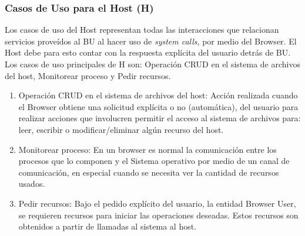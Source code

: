 \subsubsection{Casos de Uso para el Host (H)}
Los casos de uso del Host representan todas las interacciones que relacionan servicios proveídos al BU al hacer uso de \textit{system calls}, por medio del Browser. El Host debe para esto contar con la respuesta explícita del usuario detrás de BU. Los casos de uso principales de H son: Operación CRUD en el sistema de archivos del host, Monitorear proceso y Pedir recursos.
			\begin{enumerate}
				\item Operación CRUD en el sistema de archivos del host: Acción realizada cuando el Browser obtiene una solicitud explícita o no (automática), del usuario para realizar acciones que involucren permitir el acceso al sistema de archivos para: leer, escribir o modificar/eliminar algún recurso del host.

				\item Monitorear proceso: En un browser es normal la comunicación entre los procesos que lo componen y el Sistema operativo por medio de un canal de comunicación, en especial cuando se necesita ver la cantidad de recursos usados.

				\item Pedir recursos: Bajo el pedido explícito del usuario, la entidad Browser User, se requieren recursos para iniciar las operaciones deseadas. Estos recursos son obtenidos a partir de llamadas al sistema al host.
			\end{enumerate}

